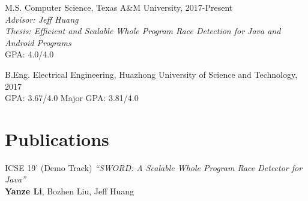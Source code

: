 \documentclass[12pt,letterpaper]{report}
\newcommand{\listtabwidth}{1.75cm}
\begin{document}
	\begin{tablist}
		
		
		\item[M.S.]  \tab Computer Science, Texas A\&M University, 2017-Present \\
		\textit{Advisor: Jeff Huang}\\
		\textit{Thesis: Efficient and Scalable Whole Program Race Detection for Java and Android Programs}\\
		GPA: 4.0/4.0
		
		\item[B.Eng.]  \tab Electrical Engineering, Huazhong University of Science and Technology, 2017 \\
		GPA: 3.67/4.0 \hspace{0.5cm} Major GPA: 3.81/4.0
				
	\end{tablist}


	


	\section*{Publications}
	\begin{tablist}
		\item[ICSE 19'] \tab (Demo Track) \textit{\enquote{SWORD: A Scalable Whole Program Race Detector for Java}} \\
							 \textbf{Yanze Li}, Bozhen Liu, Jeff Huang
	\end{tablist}

\renewcommand{\listtabwidth}{2.5cm}
\end{document}
